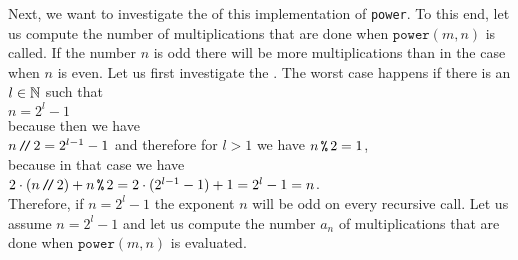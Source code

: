 Next, we want to investigate the  of this implementation of \texttt{power}.
To this end, let us compute the number of multiplications that are done when
$\mathtt{power}(m,n)$ is called.  If the number $n$ is odd there will be more multiplications than
in the case when $n$ is even.  Let us first investigate the .  
The worst case happens if there is an $l\in {\mathbb N}$ such that 
\\[0.2cm]
\hspace*{1.3cm}
$n = 2^l - 1$ 
\\[0.2cm]
because then we have 
\\[0.2cm]
\hspace*{1.3cm} $n \mbox{\,\texttt{/}$\!$\texttt{/}\,} 2 = 2^{l-1} - 1$ \quad and therefore for $l > 1$ we have \quad $n \,\texttt{\symbol{37}}\, 2 = 1$, \\[0.2cm]
because in that case we have 
\\[0.2cm]
\hspace*{1.3cm}
$2 \cdot(n \dv 2) + n \,\texttt{\symbol{37}}\, 2 = 2 \cdot (2^{l-1} - 1) + 1 = 2^l - 1 = n$.
\\[0.2cm]
Therefore, if $n = 2^l - 1$ the exponent $n$ will be odd on every recursive call.
Let us assume $n = 2^l - 1$ and let us compute the number $a_n$ of multiplications that
are done when $\mathtt{power}(m,n)$ is evaluated. 

